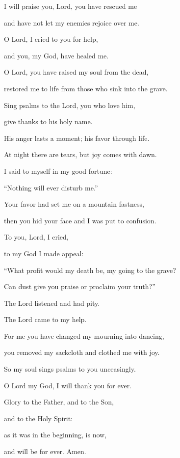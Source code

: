 \noindent I will praise you, Lord, you have rescued me~\GreStar{}~\nopagebreak

and have not let my enemies rejoice over me.

\noindent O Lord, I cried to you for help,~\GreStar{}~\nopagebreak

and you, my God, have healed me.

\noindent O Lord, you have raised my soul from the dead,~\GreStar{}~\nopagebreak

restored me to life from those who sink into the grave.

\noindent Sing psalms to the Lord, you who love him,~\GreStar{}~\nopagebreak

give thanks to his holy name.

\noindent His anger lasts a moment; his favor through life.~\GreStar{}~\nopagebreak

At night there are tears, but joy comes with dawn.

\noindent I said to myself in my good fortune:~\GreStar{}~\nopagebreak

“Nothing will ever disturb me.”

\noindent Your favor had set me on a mountain fastness,~\GreStar{}~\nopagebreak

then you hid your face and I was put to confusion.

\noindent To you, Lord, I cried,~\GreStar{}~\nopagebreak

to my God I made appeal:

\noindent ``What profit would my death be, my going to the grave?~\GreStar{}~\nopagebreak

Can dust give you praise or proclaim your truth?”

\noindent The Lord listened and had pity.~\GreStar{}~\nopagebreak

The Lord came to my help.

\noindent For me you have changed my mourning into dancing,~\GreStar{}~\nopagebreak

you removed my sackcloth and clothed me with joy.

\noindent So my soul sings psalms to you unceasingly.~\GreStar{}~\nopagebreak

O Lord my God, I will thank you for ever.

\noindent Glory to the Father, and to the Son,~\GreStar{}~\nopagebreak

and to the Holy Spirit:

\noindent as it was in the beginning, is now,~\GreStar{}~\nopagebreak

and will be for ever. Amen.

